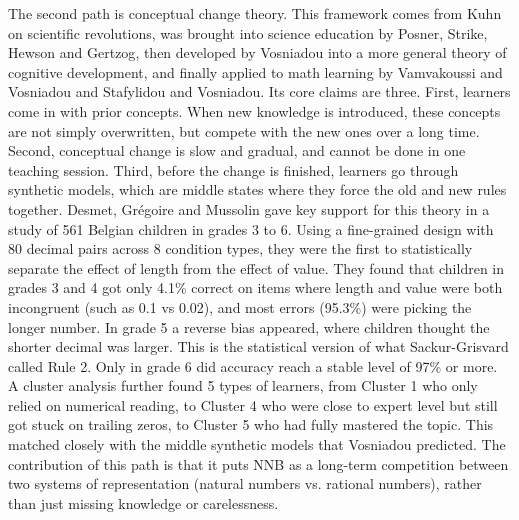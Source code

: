 The second path is conceptual change theory. This framework comes from Kuhn\cite{kuhn1962} on scientific revolutions, was brought into science education by Posner, Strike, Hewson and Gertzog\cite{posner1982}, then developed by Vosniadou\cite{vosniadou1994} into a more general theory of cognitive development, and finally applied to math learning by Vamvakoussi and Vosniadou\cite{vamvakoussi2004} and Stafylidou and Vosniadou\cite{stafylidou2004}. Its core claims are three. First, learners come in with prior concepts. When new knowledge is introduced, these concepts are not simply overwritten, but compete with the new ones over a long time. Second, conceptual change is slow and gradual, and cannot be done in one teaching session. Third, before the change is finished, learners go through synthetic models, which are middle states where they force the old and new rules together. Desmet, Grégoire and Mussolin\cite{desmet2010} gave key support for this theory in a study of 561 Belgian children in grades 3 to 6. Using a fine-grained design with 80 decimal pairs across 8 condition types, they were the first to statistically separate the effect of length from the effect of value. They found that children in grades 3 and 4 got only 4.1\% correct on items where length and value were both incongruent (such as 0.1 vs 0.02), and most errors (95.3\%) were picking the longer number. In grade 5 a reverse bias appeared, where children thought the shorter decimal was larger. This is the statistical version of what Sackur-Grisvard called Rule 2. Only in grade 6 did accuracy reach a stable level of 97\% or more. A cluster analysis further found 5 types of learners, from Cluster 1 who only relied on numerical reading, to Cluster 4 who were close to expert level but still got stuck on trailing zeros, to Cluster 5 who had fully mastered the topic. This matched closely with the middle synthetic models that Vosniadou predicted. The contribution of this path is that it puts NNB as a long-term competition between two systems of representation (natural numbers vs. rational numbers), rather than just missing knowledge or carelessness.


